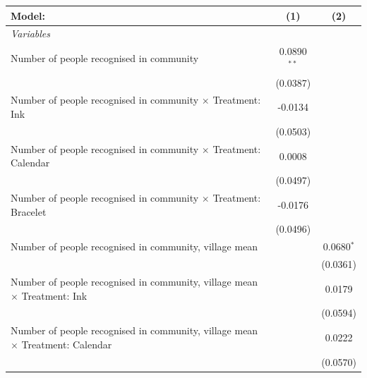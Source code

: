 \documentclass[
]{article}
\begin{document}
\begin{table}

\begingroup
\centering
\begin{tabular}{lcc}
   \tabularnewline \midrule \midrule
   Model:                                                                               & (1)           & (2)\\  
   \midrule
   \emph{Variables}\\
   Number of people recognised in community                                             & 0.0890$^{**}$ &   \\   
                                                                                        & (0.0387)      &   \\   
   Number of people recognised in community $\times$ Treatment: Ink                     & -0.0134       &   \\   
                                                                                        & (0.0503)      &   \\   
   Number of people recognised in community $\times$ Treatment: Calendar                & 0.0008        &   \\   
                                                                                        & (0.0497)      &   \\   
   Number of people recognised in community $\times$ Treatment: Bracelet                & -0.0176       &   \\   
                                                                                        & (0.0496)      &   \\   
   Number of people recognised in community, village mean                               &               & 0.0680$^{*}$\\   
                                                                                        &               & (0.0361)\\   
   Number of people recognised in community, village mean $\times$ Treatment: Ink       &               & 0.0179\\   
                                                                                        &               & (0.0594)\\   
   Number of people recognised in community, village mean $\times$ Treatment: Calendar  &               & 0.0222\\   
                                                                                        &               & (0.0570)\\   

\end{tabular}
\end{table}
\end{document}

